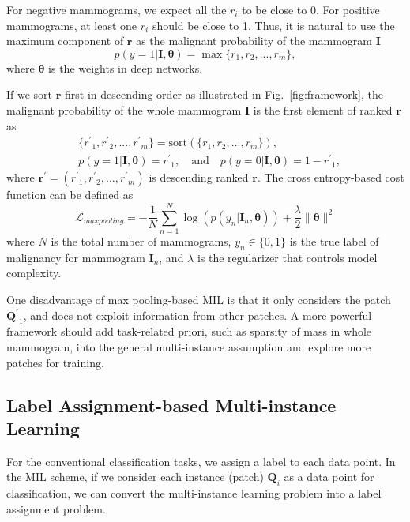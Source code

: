 \documentclass[runningheads,a4paper]{llncs}
\begin{document}
For negative mammograms, we expect all the $r_i$ to be close to 0. For positive mammograms, at least one $r_i$ should be close to 1. Thus, it is natural to use the maximum component of $\bm{r}$ as the malignant probability of the mammogram $\bm{I}$
\begin{equation}
\label{equ:max}
p(y=1|\bm{I}, \bm{\theta}) = \max\{ r_1, r_2, ..., r_m\},
\end{equation}
where $\bm{\theta}$ is the weights in deep networks.

If we sort $\bm{r}$ first in descending order as illustrated in Fig.~\ref{fig:framework}, the malignant probability of the whole mammogram $\bm{I}$ is the first element of ranked $\bm{r}$ as
\begin{equation}
\label{equ:sortmax}
\begin{aligned}
&\{{r^\prime}_1, {r^\prime}_2, ..., {r^\prime}_m\} = \text{sort} (\{ r_1, r_2, ..., r_m\}), \\
&p(y=1|\bm{I}, \bm{\theta}) = {r^\prime}_1, \quad\text{and}\quad p(y=0|\bm{I}, \bm{\theta}) = 1-{r^\prime}_1,
\end{aligned}
\end{equation}
where $\bm{r}^\prime = ({r^\prime}_1, {r^\prime}_2, ..., {r^\prime}_m)$ is descending ranked $\bm{r}$. The cross entropy-based cost function can be defined as  %
\begin{equation}
\label{equ:maxloss}
\mathcal{L}_{maxpooling} = -\frac{1}{N}\sum_{n=1}^{N} \log(p(y_n | \bm{I}_n, \bm{\theta})) + \frac{\lambda}{2} \|\bm{\theta}\|^2
\end{equation}
where $N$ is the total number of mammograms, $y_n \in \{0,1\}$ is the true label of malignancy for mammogram $\bm{I}_n$, and $\lambda$ is the regularizer that controls model complexity.

One disadvantage of max pooling-based MIL is that it only considers the patch ${\bm{Q}^\prime}_1$, and does not exploit information from other patches. A more powerful framework should add task-related priori, such as sparsity of mass in whole mammogram, into the general multi-instance assumption and explore more patches for training. %
\subsection{Label Assignment-based Multi-instance Learning}\label{sec:labelassign}
For the conventional classification tasks, we assign a label to each data point. In the MIL scheme, if we consider each instance (patch) $\bm{Q}_i$ as a data point for classification, we can convert the multi-instance learning problem into a label assignment problem.
\end{document}
